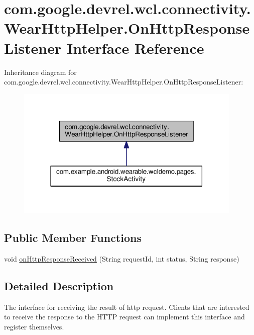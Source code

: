 \hypertarget{interfacecom_1_1google_1_1devrel_1_1wcl_1_1connectivity_1_1WearHttpHelper_1_1OnHttpResponseListener}{}\section{com.\+google.\+devrel.\+wcl.\+connectivity.\+Wear\+Http\+Helper.\+On\+Http\+Response\+Listener Interface Reference}
\label{interfacecom_1_1google_1_1devrel_1_1wcl_1_1connectivity_1_1WearHttpHelper_1_1OnHttpResponseListener}


Inheritance diagram for com.\+google.\+devrel.\+wcl.\+connectivity.\+Wear\+Http\+Helper.\+On\+Http\+Response\+Listener\+:
\nopagebreak
\begin{figure}[H]
\begin{center}
\leavevmode
\includegraphics[width=306pt]{d9/d44/interfacecom_1_1google_1_1devrel_1_1wcl_1_1connectivity_1_1WearHttpHelper_1_1OnHttpResponseListener__inherit__graph}
\end{center}
\end{figure}
\subsection*{Public Member Functions}
\begin{DoxyCompactItemize}
\item 
void \hyperlink{interfacecom_1_1google_1_1devrel_1_1wcl_1_1connectivity_1_1WearHttpHelper_1_1OnHttpResponseListener_a4a50a3e8b12bfdc0be91232a1e7b4ac9}{on\+Http\+Response\+Received} (String request\+Id, int status, String response)
\end{DoxyCompactItemize}


\subsection{Detailed Description}
The interface for receiving the result of http request. Clients that are interested to receive the response to the H\+T\+TP request can implement this interface and register themselves.

